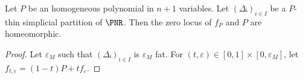   \begin{prop}
    Let $P$ be an homogeneous polynomial in $n+1$ variables.
    Let $(Δᵢ)_{i∈I}$ be a $P$-thin simplicial partition of $\PNR$. Then the zero
    locus of $f_P$ and $P$ are homeomorphic.
  \end{prop}

  \begin{proof}
    Let $ε_M$ such that $(Δᵢ)_{i∈I}$ is $ε_M$ fat. For $(t,ε) ∈ [0,1] ×
    [0,ε_M]$, let $f_{t,ε} = (1-t) P + t f_ε$.
  \end{proof}
